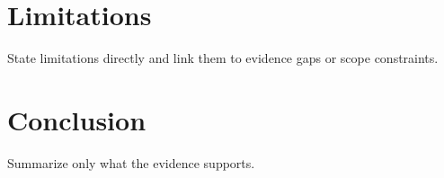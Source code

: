 \documentclass[10pt]{article}
\begin{document}
\section{Limitations}

State limitations directly and link them to evidence gaps or scope constraints.

\section{Conclusion}

Summarize only what the evidence supports.




\appendix

\end{document}
